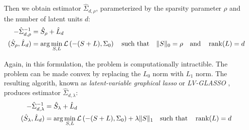 Then we obtain estimator $\hat\Sigma_{d,\rho}$, parameterized by the sparsity parameter $\rho$ and  the number of latent units $d$:
\begin{equation}
\begin{split}
-\hat\Sigma_{d,\rho}^{-1} &= \hat S_\rho + \hat L_d
\\
(\hat S_\rho, \hat L_d) &= \arg\min\limits_{S,L} \mathcal L\left(-(S+L),\Sigma_0\right) \quad \mbox{such that} \quad \|S\|_0=\rho \quad \mbox{and} \quad \operatorname{rank}(L) = d
\end{split}
\end{equation}

Again, in this formulation, the problem is computationally intractible.  The problem can be made convex by replacing the $L_0$ norm with $L_1$ norm. The resulting algorith, known as \emph{latent-variable graphical lasso} or \emph{LV-GLASSO} \cite{Chandrasekaran:2010,Ma:2013}, produces estimator $\hat\Sigma_{d,\lambda}$:
\begin{equation}
\begin{split}
-\hat\Sigma_{d,\lambda}^{-1} &= \hat S_\lambda + \hat L_d
\\
(\hat S_\lambda, \hat L_d) &= \arg\min\limits_{S,L} \mathcal L\left(-(S+L),\Sigma_0\right) + \lambda \| S \|_1 \quad \mbox{such that}  \quad \operatorname{rank}(L) = d
\end{split}
\end{equation}